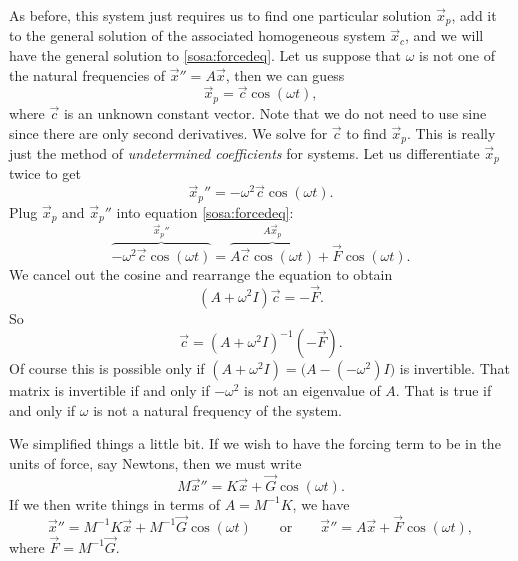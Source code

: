 As before, this system just requires us to find one particular solution
$\vec{x}_p$, add it to the general solution of the associated homogeneous system
$\vec{x}_c$, and we will have the general solution to \eqref{sosa:forcedeq}.
Let us suppose that $\omega$ is not one of the natural frequencies of
${\vec{x}}'' = A \vec{x}$, then we can guess
\begin{equation*}
\vec{x}_p = \vec{c} \cos (\omega t) ,
\end{equation*}
where $\vec{c}$ is an unknown constant vector.  Note that we do not need
to use sine since there are only second derivatives.  We solve for $\vec{c}$ to
find $\vec{x}_p$.  This is really just the method of
\emph{undetermined coefficients}
for systems.  Let us differentiate $\vec{x}_p$ twice to get
\begin{equation*}
{\vec{x}_p}'' = -\omega^2 \vec{c} \cos (\omega t) .
\end{equation*}
Plug $\vec{x}_p$ and ${\vec{x}_p}''$ into equation \eqref{sosa:forcedeq}:
\begin{equation*}
\overbrace{
-\omega^2 \vec{c} \cos (\omega t)
}^{{\vec{x}_p}''}
=
\overbrace{
A \vec{c} \cos (\omega t) 
}^{A \vec{x}_p}
+ \vec{F} \cos (\omega t) .
\end{equation*}
We cancel out the cosine and rearrange the equation to obtain
\begin{equation*}
(A +\omega^2 I) \vec{c}
=
- \vec{F} .
\end{equation*}
So
\begin{equation*}
\vec{c}
=
{(A +\omega^2 I)}^{-1}
(-\vec{F} ).
\end{equation*}
Of course this is possible only if
$(A+ \omega^2 I) = \bigl(A- (-\omega^2) I\bigr)$ is
invertible.  That matrix is invertible if and only if
$-\omega^2$ is not an eigenvalue of $A$.  That is true if and only if $\omega$
is not a natural frequency of the system.

We simplified things a little bit.  If we wish to have the
forcing term to be in the units of force, say Newtons, then we must write
\begin{equation*}
M \vec{x}'' = K \vec{x} + \vec{G} \cos(\omega t) .
\end{equation*}
If we then write things in terms of $A = M^{-1} K$, we have
\begin{equation*}
\vec{x}'' = M^{-1}K \vec{x} + M^{-1} \vec{G} \cos(\omega t) 
\qquad \text{or} \qquad
\vec{x}'' = A \vec{x} + \vec{F} \cos(\omega t) ,
\end{equation*}
where $\vec{F} = M^{-1} \vec{G}$.

